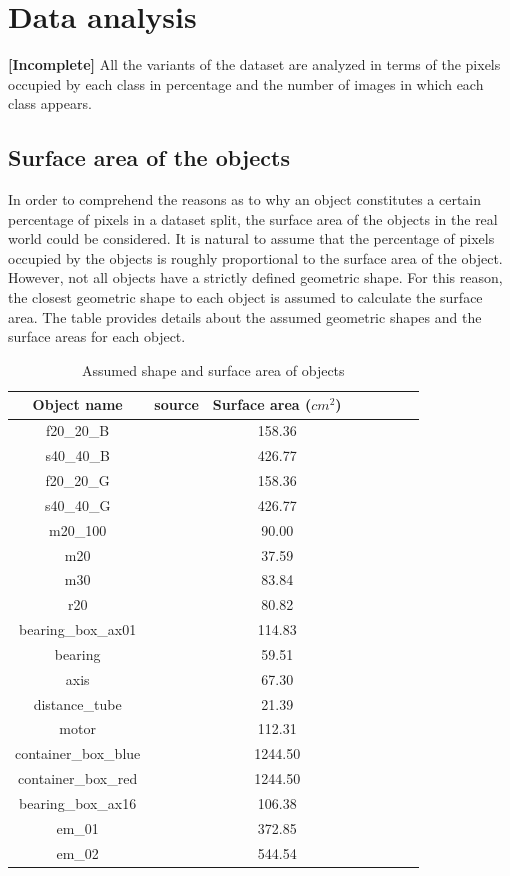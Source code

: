 \section{Data analysis}
\label{section:analysis}

\textbf{[Incomplete]}
	All the variants of the dataset are analyzed in terms of the pixels occupied by each class in percentage and the number of images in which each class appears. 
	
	\subsection{Surface area of the objects}
		
		In order to comprehend the reasons as to why an object constitutes a certain percentage of pixels in a dataset split, the surface area of the objects in the real world could be considered. It is natural to assume that the percentage of pixels occupied by the objects is roughly proportional to the surface area of the object. However, not all objects have a strictly defined geometric shape. For this reason, the closest geometric shape to each object is assumed to calculate the surface area. The table provides details about the assumed geometric shapes and the surface areas for each object.
		
		\begin{table}
			\centering
			\begin{tabular}{|c|c|c|c|c|c|c|c|}
			\hline 
  			\textbf{Object name} & \textbf{source} & \textbf{Surface area ($cm^2$)} \\ 
			\hline
  			 f20\_20\_B &  & 158.36 \\ 
			\hline
  			 s40\_40\_B &  & 426.77 \\ 
			\hline
  			 f20\_20\_G &  & 158.36 \\ 
			\hline
  			 s40\_40\_G &  & 426.77 \\ 
			\hline
  			 m20\_100 &  & 90.00 \\ 
			\hline
  			 m20 &  & 37.59 \\ 
			\hline
  			 m30 &  & 83.84 \\ 
			\hline
  			 r20 &  & 80.82 \\ 
			\hline
  			 bearing\_box\_ax01 &  & 114.83 \\ 
			\hline
  			 bearing &  & 59.51 \\ 
			\hline
  			 axis &  & 67.30 \\ 
			\hline
  			 distance\_tube &  & 21.39 \\ 
			\hline
  			 motor &  & 112.31 \\ 
			\hline
  			 container\_box\_blue &  & 1244.50 \\ 
			\hline
  			 container\_box\_red &  & 1244.50 \\ 
			\hline
  			 bearing\_box\_ax16 &  & 106.38 \\ 
			\hline
  			 em\_01 &  & 372.85 \\ 
			\hline
  			 em\_02 &  & 544.54 \\ 
			\hline
			\end{tabular}
			\caption{Assumed shape and surface area of objects} 
			\label{Table:surface}
		\end{table}
		
